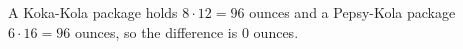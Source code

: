 A Koka-Kola package holds $8\cdot12=96$ ounces and a Pepsy-Kola package $6\cdot16=96$ ounces, so the difference is $\boxed{0}$ ounces.
